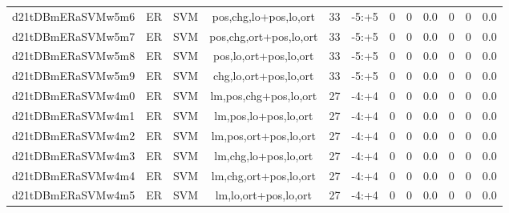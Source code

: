\documentclass[a4paper]{article}
\begin{document}
\begin{landscape}
\begin{center}
\begin{tabular}{ |c|c|c|c|c|c|c|c|c|c|c|c|}
 
 	
 	\small{ d21tDBmERaSVMw5m6 } & ER & SVM & pos,chg,lo+pos,lo,ort  &  33 &  -5:+5  &  0 & 0 & 0.0  &  0 & 0 & 0.0 \\
 	

 
 	
 	\small{ d21tDBmERaSVMw5m7 } & ER & SVM & pos,chg,ort+pos,lo,ort  &  33 &  -5:+5  &  0 & 0 & 0.0  &  0 & 0 & 0.0 \\
 	

 
 	
 	\small{ d21tDBmERaSVMw5m8 } & ER & SVM & pos,lo,ort+pos,lo,ort  &  33 &  -5:+5  &  0 & 0 & 0.0  &  0 & 0 & 0.0 \\
 	

 
 	
 	\small{ d21tDBmERaSVMw5m9 } & ER & SVM & chg,lo,ort+pos,lo,ort  &  33 &  -5:+5  &  0 & 0 & 0.0  &  0 & 0 & 0.0 \\
 	

 
 	
 	\small{ d21tDBmERaSVMw4m0 } & ER & SVM & lm,pos,chg+pos,lo,ort  &  27 &  -4:+4  &  0 & 0 & 0.0  &  0 & 0 & 0.0 \\
 	

 
 	
 	\small{ d21tDBmERaSVMw4m1 } & ER & SVM & lm,pos,lo+pos,lo,ort  &  27 &  -4:+4  &  0 & 0 & 0.0  &  0 & 0 & 0.0 \\
 	

 
 	
 	\small{ d21tDBmERaSVMw4m2 } & ER & SVM & lm,pos,ort+pos,lo,ort  &  27 &  -4:+4  &  0 & 0 & 0.0  &  0 & 0 & 0.0 \\
 	

 
 	
 	\small{ d21tDBmERaSVMw4m3 } & ER & SVM & lm,chg,lo+pos,lo,ort  &  27 &  -4:+4  &  0 & 0 & 0.0  &  0 & 0 & 0.0 \\
 	

 
 	
 	\small{ d21tDBmERaSVMw4m4 } & ER & SVM & lm,chg,ort+pos,lo,ort  &  27 &  -4:+4  &  0 & 0 & 0.0  &  0 & 0 & 0.0 \\
 	

 
 	
 	\small{ d21tDBmERaSVMw4m5 } & ER & SVM & lm,lo,ort+pos,lo,ort  &  27 &  -4:+4  &  0 & 0 & 0.0  &  0 & 0 & 0.0 \\
 	
 \hline
\end{tabular}
\end{center}





\end{landscape}
\end{document}
